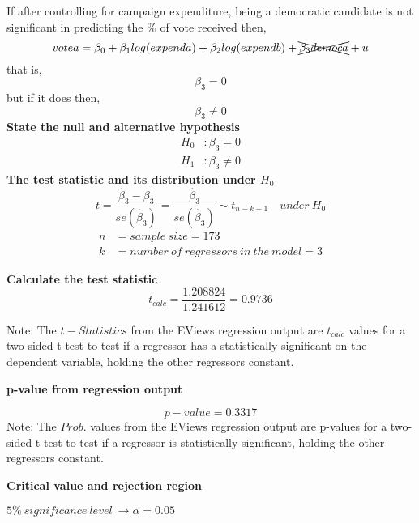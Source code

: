 \documentclass[12pt]{report}
\begin{document}
\noindent If after controlling for campaign expenditure, being a democratic candidate is not significant in predicting the \% of vote received then,
$$votea = \beta_0 + \beta_1log(expenda) + \beta_2log(expendb) + \xcancel{\beta_3democa} + u $$
\noindent that is,
$$\beta_3 = 0$$
\noindent but if it does then,
$$\beta_3 \neq 0$$
\noindent \textbf{State the null and alternative hypothesis}
\begin{align*}
H_0&: \beta_3 = 0 \\
H_1&: \beta_3 \neq 0
\end{align*}
\noindent \textbf{The test statistic and its distribution under $H_0$}
$$t = \dfrac{\hat{\beta}_3 - \beta_3}{se(\hat{\beta}_3)} = \dfrac{\hat{\beta}_3}{se(\hat{\beta}_3)} \sim t_{n-k-1} \quad under\ H_0$$
\begin{align*}
n &= sample\ size = 173 \\
k &= number\ of\ regressors\ in\ the\ model = 3
\end{align*}

\noindent \textbf{Calculate the test statistic}
$$t_{calc} = \dfrac{1.208824}{1.241612} = 0.9736$$
\begin{figure}[H]
	\centering
\end{figure}
\vspace{-\baselineskip}
\noindent Note: The $t-Statistics$ from the EViews regression output are $t_{calc}$ values for a two-sided t-test to test if a regressor has a statistically significant on the dependent variable, holding the other regressors constant.

\newpage
\noindent \textbf{p-value from regression output}
\begin{figure}[H]
	\centering
\end{figure}
\vspace{-\baselineskip}
$$p-value = 0.3317$$
\noindent Note: The $Prob.$ values from the EViews regression output are p-values for a two-sided t-test to test if a regressor is statistically significant, holding the other regressors constant.

\noindent \textbf{Critical value and rejection region}

\noindent $5\%\ significance\ level\ \to \alpha = 0.05$
\end{document}
